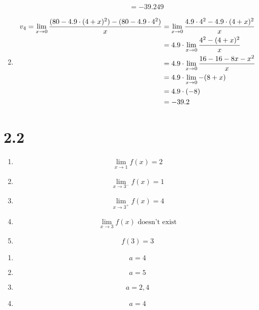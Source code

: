 \documentclass{../../classes/anal}
\begin{document}
\begin{problem}{5}
\begin{enumerate}[label={(\alph*)}]
\begin{enumerate}[label={(\roman*)}]
\begin{align*}
                    &= -39.249
                \end{align*}
            \end{enumerate}
            \item {
                \begin{align*}
                    v_4=
                    \lim_{x \rightarrow 0}{(80 - 4.9\cdot(4 + x)^2) - (80 - 4.9\cdot4^2) \over x}
                    &= \lim_{x \rightarrow 0}{4.9 \cdot 4^2 - 4.9 \cdot (4 +  x)^2 \over x} \\
                    &= 4.9 \cdot \lim_{x \rightarrow 0} {4^2 - (4 + x)^2 \over x} \\
                    &= 4.9 \cdot \lim_{x \rightarrow 0} {16 - 16 - 8x - x^2 \over x} \\
                    &= 4.9 \cdot \lim_{x \rightarrow 0} - (8 + x) \\
                    &= 4.9\cdot(-8) \\
                    &= -39.2
                \end{align*}
            }
        \end{enumerate}
    \end{problem}

    \section*{2.2}
    \begin{problem}{5}
        \begin{enumerate}[label={(\alph*)}]
            \item \[\lim_{x\rightarrow1}f(x)=2\]
            \item \[\lim_{x\rightarrow3^-}f(x)=1\]
            \item \[\lim_{x\rightarrow3^+}f(x)=4\]
            \item \[\lim_{x\rightarrow3}f(x) \text{ doesn't exist}\]
            \item \[f(3) = 3\]
        \end{enumerate}
    \end{problem}

    \begin{problem}{7}
        \begin{enumerate}[label={(\alph*)}]
            \item \[a=4\]
            \item \[a=5\]
            \item \[a=2,4\]
            \item \[a=4\]
        \end{enumerate}
    \end{problem}
\end{document}
